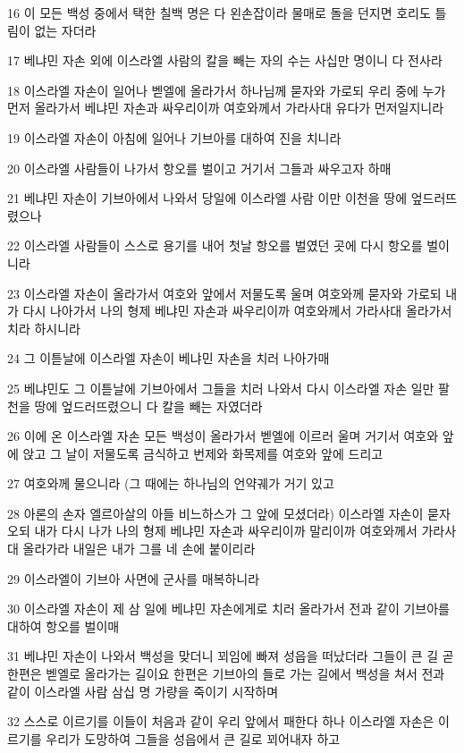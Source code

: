 \par 16 이 모든 백성 중에서 택한 칠백 명은 다 왼손잡이라 물매로 돌을 던지면 호리도 틀림이 없는 자더라
\par 17 베냐민 자손 외에 이스라엘 사람의 칼을 빼는 자의 수는 사십만 명이니 다 전사라
\par 18 이스라엘 자손이 일어나 벧엘에 올라가서 하나님께 묻자와 가로되 우리 중에 누가 먼저 올라가서 베냐민 자손과 싸우리이까 여호와께서 가라사대 유다가 먼저일지니라
\par 19 이스라엘 자손이 아침에 일어나 기브아를 대하여 진을 치니라
\par 20 이스라엘 사람들이 나가서 항오를 벌이고 거기서 그들과 싸우고자 하매
\par 21 베냐민 자손이 기브아에서 나와서 당일에 이스라엘 사람 이만 이천을 땅에 엎드러뜨렸으나
\par 22 이스라엘 사람들이 스스로 용기를 내어 첫날 항오를 벌였던 곳에 다시 항오를 벌이니라
\par 23 이스라엘 자손이 올라가서 여호와 앞에서 저물도록 울며 여호와께 묻자와 가로되 내가 다시 나아가서 나의 형제 베냐민 자손과 싸우리이까 여호와께서 가라사대 올라가서 치라 하시니라
\par 24 그 이튿날에 이스라엘 자손이 베냐민 자손을 치러 나아가매
\par 25 베냐민도 그 이튿날에 기브아에서 그들을 치러 나와서 다시 이스라엘 자손 일만 팔천을 땅에 엎드러뜨렸으니 다 칼을 빼는 자였더라
\par 26 이에 온 이스라엘 자손 모든 백성이 올라가서 벧엘에 이르러 울며 거기서 여호와 앞에 앉고 그 날이 저물도록 금식하고 번제와 화목제를 여호와 앞에 드리고
\par 27 여호와께 물으니라 (그 때에는 하나님의 언약궤가 거기 있고
\par 28 아론의 손자 엘르아살의 아들 비느하스가 그 앞에 모셨더라) 이스라엘 자손이 묻자오되 내가 다시 나가 나의 형제 베냐민 자손과 싸우리이까 말리이까 여호와께서 가라사대 올라가라 내일은 내가 그를 네 손에 붙이리라
\par 29 이스라엘이 기브아 사면에 군사를 매복하니라
\par 30 이스라엘 자손이 제 삼 일에 베냐민 자손에게로 치러 올라가서 전과 같이 기브아를 대하여 항오를 벌이매
\par 31 베냐민 자손이 나와서 백성을 맞더니 꾀임에 빠져 성읍을 떠났더라 그들이 큰 길 곧 한편은 벧엘로 올라가는 길이요 한편은 기브아의 들로 가는 길에서 백성을 쳐서 전과 같이 이스라엘 사람 삼십 명 가량을 죽이기 시작하며
\par 32 스스로 이르기를 이들이 처음과 같이 우리 앞에서 패한다 하나 이스라엘 자손은 이르기를 우리가 도망하여 그들을 성읍에서 큰 길로 꾀어내자 하고
